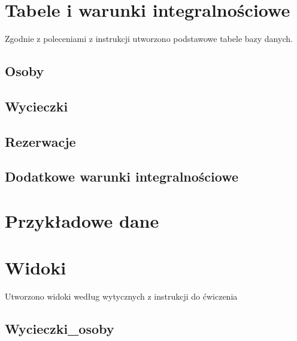 \documentclass[12pt, a4paper]{mwrep}
\begin{document}
\tableofcontents

\newpage

\chapter{Tabele i warunki integralnościowe}

Zgodnie z poleceniami z instrukcji utworzono podstawowe tabele bazy danych.

\section{Osoby}



\section{Wycieczki}



\section{Rezerwacje}



\section{Dodatkowe warunki integralnościowe}



\chapter{Przykładowe dane}



\chapter{Widoki}

Utworzono widoki według wytycznych z instrukcji do ćwiczenia

\section{Wycieczki\_osoby}


\end{document}
